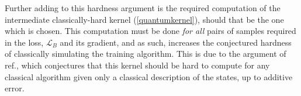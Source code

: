 Further adding to this hardness argument is the required computation of the intermediate classically-hard kernel (\ref{quantumkernel}), should that be the one which is chosen. This computation must be done \textit{for all} pairs of samples required in the loss, $\mathcal{L}_B$ and its gradient, and as such, increases the conjectured hardness of classically simulating the training algorithm. This is due to the argument of ref., which conjectures that this kernel should be hard to compute for any classical algorithm given only a classical description of the states, up to additive error. 
















